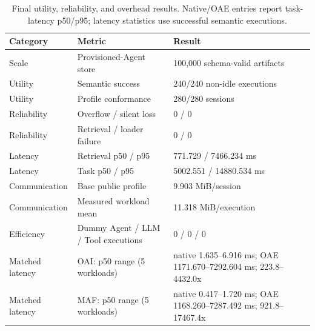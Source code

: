 \begin{table}[t]
\centering
\caption{Final utility, reliability, and overhead results. Native/OAE entries report task-latency p50/p95; latency statistics use successful semantic executions.}
\label{tab:final-results}
\scriptsize
\setlength{\tabcolsep}{2.8pt}
\begin{tabular}{@{}p{}p{}p{}@{}}
\toprule
Category & Metric & Result \\
\midrule
Scale & Provisioned-Agent store & 100,000 schema-valid artifacts \\
Utility & Semantic success & 240/240 non-idle executions \\
Utility & Profile conformance & 280/280 sessions \\
Reliability & Overflow / silent loss & 0 / 0 \\
Reliability & Retrieval / loader failure & 0 / 0 \\
Latency & Retrieval p50 / p95 & 771.729 / 7466.234 ms \\
Latency & Task p50 / p95 & 5002.551 / 14880.534 ms \\
Communication & Base public profile & 9.903 MiB/session \\
Communication & Measured workload mean & 11.318 MiB/execution \\
Efficiency & Dummy Agent / LLM / Tool executions & 0 / 0 / 0 \\
Matched latency & OAI: p50 range (5 workloads) & native 1.635--6.916 ms; OAE 1171.670--7292.604 ms; 223.8--4432.0x \\
Matched latency & MAF: p50 range (5 workloads) & native 0.417--1.720 ms; OAE 1168.260--7287.492 ms; 921.8--17467.4x \\
\bottomrule
\end{tabular}
\end{table}
